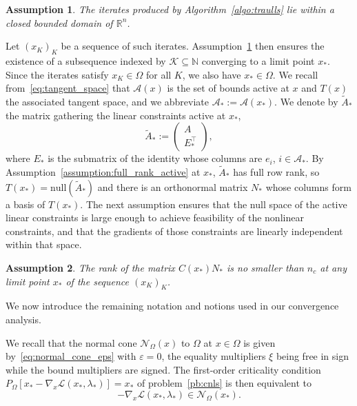 \documentclass[pdflatex,sn-mathphys-num]{sn-jnl}%
\theoremstyle{thmstyleone}%
\newtheorem{assumption}{Assumption}
\newcommand{\RR}{{\mathbb{R}}} %
\newcommand{\NN}{{\mathbb{N}}} %
\newcommand{\calA}{{\mathcal{A}}}
\newcommand{\calL}{{\mathcal{L}}}
\newcommand{\calK}{{\mathcal{K}}}
\newcommand{\calN}{{\mathcal{N}}}
\newcommand{\proj}[2]{P_{#1} \left[ {#2} \right]} %
\begin{document}
\begin{assumption}\label{assumption:iterates_domain_bounded}
	The iterates produced by Algorithm~\ref{algo:traulls} lie within a closed bounded domain of $\RR^n$.
\end{assumption}

Let $(x_K)_K$ be a sequence of such iterates. Assumption~\ref{assumption:iterates_domain_bounded} then ensures the existence of a subsequence indexed by $\calK \subseteq \NN$ converging to a limit point $x_*$. Since the iterates satisfy $x_K \in \Omega$ for all $K$, we also have $x_* \in \Omega$. We recall from~\eqref{eq:tangent_space} that $\calA(x)$ is the set of bounds active at $x$ and $T(x)$ the associated tangent space, and we abbreviate $\calA_* := \calA(x_*)$. We denote by $\tilde A_*$ the matrix gathering the linear constraints active at $x_*$,
\begin{equation*}
	\tilde A_* := \begin{pmatrix} A \\ E^\top_* \end{pmatrix},
\end{equation*}
where $E_*$ is the submatrix of the identity whose columns are $e_i$, $i \in \calA_*$. By Assumption~\ref{assumption:full_rank_active} at $x_*$, $\tilde A_*$ has full row rank, so $T(x_*) = \mathrm{null}(\tilde A_*)$ and there is an orthonormal matrix $N_*$ whose columns form a basis of $T(x_*)$. The next assumption ensures that the null space of the active linear constraints is large enough to achieve feasibility of the nonlinear constraints, and that the gradients of those constraints are linearly independent within that space.

\begin{assumption}\label{assumption:cq_null_space_jacobian}
	The rank of the matrix $C(x_*)N_*$ is no smaller than $n_c$ at any limit point $x_*$ of the sequence $(x_K)_K$.
\end{assumption}

We now introduce the remaining notation and notions used in our convergence analysis.

We recall that the normal cone $\calN_\Omega(x)$ to $\Omega$ at $x \in \Omega$ is given by~\eqref{eq:normal_cone_eps} with $\varepsilon = 0$, the equality multipliers $\xi$ being free in sign while the bound multipliers are signed. The first-order criticality condition $\proj{\Omega}{x_*-\nabla_x\calL(x_*,\lambda_*)}=x_*$ of problem~\eqref{pb:cnls} is then equivalent to
\[-\nabla_x\calL(x_*,\lambda_*)\in \calN_\Omega(x_*).\]
\end{document}
